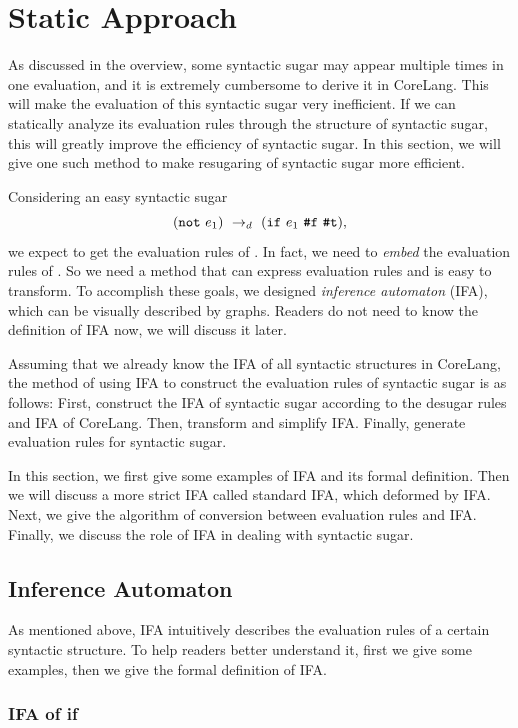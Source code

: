 \section{Static Approach}

As discussed in the overview, some syntactic sugar may appear multiple times in one evaluation, and it is extremely cumbersome to derive it in CoreLang. This will make the evaluation of this syntactic sugar very inefficient. If we can statically analyze its evaluation rules through the structure of syntactic sugar, this will greatly improve the efficiency of syntactic sugar. In this section, we will give one such method to make resugaring of syntactic sugar more efficient.

Considering an easy syntactic sugar 
\[(\mbox{\tt not}~e_1) ~\rightarrow_d~ (\mbox{\tt if}~e_1~\mbox{\tt \#f}~\mbox{\tt \#t}),\]
we expect to get the evaluation rules of . In fact, we need to \textit{embed} the evaluation rules of . So we need a method that can express evaluation rules and is easy to transform. To accomplish these goals, we designed \textit{inference automaton} (IFA), which can be visually described by graphs. Readers do not need to know the definition of IFA now, we will discuss it later.

Assuming that we already know the IFA of all syntactic structures in CoreLang, the method of using IFA to construct the evaluation rules of syntactic sugar is as follows: First, construct the IFA of syntactic sugar according to the desugar rules and IFA of CoreLang. Then, transform and simplify IFA. Finally, generate evaluation rules for syntactic sugar.

In this section, we first give some examples of IFA and its formal definition. Then we will discuss a more strict IFA called standard IFA, which deformed by IFA. Next, we give the algorithm of conversion between evaluation rules and IFA. Finally, we discuss the role of IFA in dealing with syntactic sugar.

\subsection{Inference Automaton}

As mentioned above, IFA intuitively describes the evaluation rules of a certain syntactic structure. To help readers better understand it, first we give some examples, then we give the formal definition of IFA.

\subsubsection{IFA of if}


